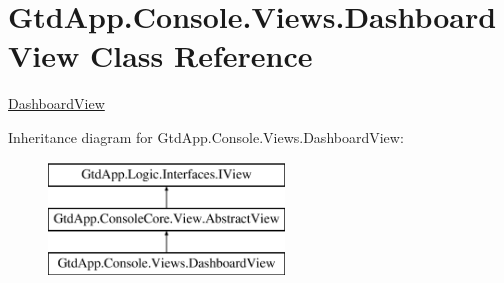 \hypertarget{class_gtd_app_1_1_console_1_1_views_1_1_dashboard_view}{}\section{Gtd\+App.\+Console.\+Views.\+Dashboard\+View Class Reference}
\label{class_gtd_app_1_1_console_1_1_views_1_1_dashboard_view}


\mbox{\hyperlink{class_gtd_app_1_1_console_1_1_views_1_1_dashboard_view}{Dashboard\+View}}  


Inheritance diagram for Gtd\+App.\+Console.\+Views.\+Dashboard\+View\+:\begin{figure}[H]
\begin{center}
\leavevmode
\includegraphics[height=3.000000cm]{class_gtd_app_1_1_console_1_1_views_1_1_dashboard_view}
\end{center}
\end{figure}
